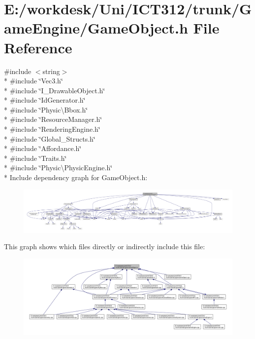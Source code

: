 \section{E\+:/workdesk/\+Uni/\+I\+C\+T312/trunk/\+Game\+Engine/\+Game\+Object.h File Reference}
\label{_game_object_8h}
{\ttfamily \#include $<$string$>$}\\*
{\ttfamily \#include \char`\"{}Vec3.\+h\char`\"{}}\\*
{\ttfamily \#include \char`\"{}I\+\_\+\+Drawable\+Object.\+h\char`\"{}}\\*
{\ttfamily \#include \char`\"{}Id\+Generator.\+h\char`\"{}}\\*
{\ttfamily \#include \char`\"{}Physic\textbackslash{}\+Bbox.\+h\char`\"{}}\\*
{\ttfamily \#include \char`\"{}Resource\+Manager.\+h\char`\"{}}\\*
{\ttfamily \#include \char`\"{}Rendering\+Engine.\+h\char`\"{}}\\*
{\ttfamily \#include \char`\"{}Global\+\_\+\+Structs.\+h\char`\"{}}\\*
{\ttfamily \#include \char`\"{}Affordance.\+h\char`\"{}}\\*
{\ttfamily \#include \char`\"{}Traits.\+h\char`\"{}}\\*
{\ttfamily \#include \char`\"{}Physic\textbackslash{}\+Physic\+Engine.\+h\char`\"{}}\\*
Include dependency graph for Game\+Object.\+h\+:\nopagebreak
\begin{figure}[H]
\begin{center}
\leavevmode
\includegraphics[width=350pt]{d9/df2/_game_object_8h__incl}
\end{center}
\end{figure}
This graph shows which files directly or indirectly include this file\+:
\nopagebreak
\begin{figure}[H]
\begin{center}
\leavevmode
\includegraphics[width=350pt]{d5/d05/_game_object_8h__dep__incl}
\end{center}
\end{figure}
